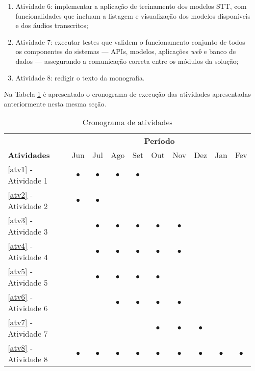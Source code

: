 \documentclass[
	12pt,				%
	a4paper,			%
	english,			%
	brazil,				%
	]{article}
\begin{document}
\begin{enumerate}
	\item Atividade 6: implementar a aplicação de treinamento dos modelos STT, com funcionalidades que incluam a listagem e visualização dos modelos disponíveis e dos áudios transcritos; \label{atv6}
	
	\item Atividade 7: executar testes que validem o funcionamento conjunto de todos os componentes do sistemas — APIs, modelos, aplicações \textit{web} e banco de dados — assegurando a comunicação correta entre os módulos da solução; \label{atv7}
	
	\item Atividade 8: redigir o texto da monografia. \label{atv8}
\end{enumerate}


Na Tabela \ref{tabela:cronograma} é apresentado o cronograma de execução das atividades apresentadas anteriormente nesta mesma seção.
 
\begin{table}[ht]
	\scriptsize
	\centering
	\begin{tabular}{|l|c|c|c|c|c|c|c|c|c|}
		\hline &  \multicolumn{9}{|c|}{\textbf{Período}} \\ \cline{2-10}
		\textbf{Atividades} & Jun & Jul & Ago & Set & Out & Nov & Dez & Jan & Fev \\ \hline \hline
		\ref{atv1} - Atividade 1 & $\bullet$ & $\bullet$ & $\bullet$ & $\bullet$ & & & & & \\ \hline
		\ref{atv2} - Atividade 2 & $\bullet$ & $\bullet$ & & & & & & & \\ \hline
		\ref{atv3} - Atividade 3 & & $\bullet$ & $\bullet$ & $\bullet$ & $\bullet$ & $\bullet$ & & & \\ \hline
		\ref{atv4} - Atividade 4 & & $\bullet$ & $\bullet$ & $\bullet$ & $\bullet$ & $\bullet$ & & & \\ \hline
		\ref{atv5} - Atividade 5 & & $\bullet$ & $\bullet$ & $\bullet$ & $\bullet$ & & & & \\ \hline
		\ref{atv6} - Atividade 6 & & & $\bullet$ & $\bullet$ & $\bullet$ & $\bullet$ & & & \\ \hline
		\ref{atv7} - Atividade 7 & & & & & $\bullet$ & $\bullet$ & $\bullet$ &  &  \\ \hline
		\ref{atv8} - Atividade 8 & $\bullet$ & $\bullet$ & $\bullet$ & $\bullet$ & $\bullet$ & $\bullet$ & $\bullet$ & $\bullet$ & $\bullet$ \\ \hline
	\end{tabular}
	\caption{Cronograma de atividades}
	\label{tabela:cronograma}
\end{table}
\end{document}
